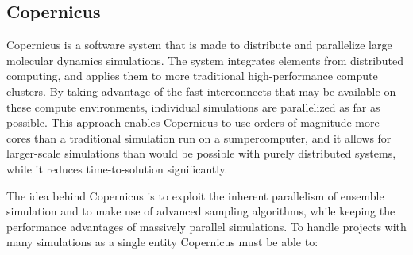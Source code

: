 \subsection{Copernicus}
Copernicus is a software system that is made to distribute and
parallelize large molecular dynamics simulations. The system
integrates elements from distributed computing, and applies them to
more traditional high-performance compute clusters. By taking
advantage of the fast interconnects that may be available on these
compute environments, individual simulations are parallelized as far
as possible. This approach enables Copernicus to use
orders-of-magnitude more cores than a traditional simulation run on a
sumpercomputer, and it allows for larger-scale simulations than would
be possible with purely distributed systems, while it reduces
time-to-solution significantly.

The idea behind Copernicus is to exploit the inherent parallelism of
ensemble simulation and to make use of advanced sampling algorithms,
while keeping the performance advantages of massively parallel
simulations. To handle projects with many simulations as a single
entity Copernicus must be able to\citep{pronk:2011}:




